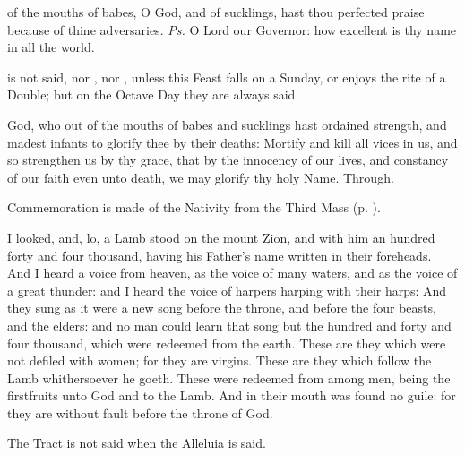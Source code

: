 
\introit
{} of the mouths of babes, O God, and of sucklings, hast thou perfected praise because of thine adversaries. \textit{Ps.} O Lord our Governor: how excellent is thy name in all the world.
\begin{rubric}
     is not said, nor , nor , unless this Feast falls on a Sunday, or enjoys the rite of a  Double; but on the Octave Day they are always said.
\end{rubric}
\collect
{} God, who out of the mouths of babes and sucklings hast ordained strength, and madest infants to glorify thee by their deaths: Mortify and kill all vices in us, and so strengthen us by thy grace, that by the innocency of our lives, and constancy of our faith even unto death, we may glorify thy holy Name. Through.
\begin{rubric}
    Commemoration is made of the Nativity from the Third Mass (p. \pageref{NativityMassIIICollect}).
\end{rubric}
 I looked, and, lo, a Lamb stood on the mount Zion, and with him an hundred forty and four thousand, having his Father's name written in their foreheads. And I heard a voice from heaven, as the voice of many waters, and as the voice of a great thunder: and I heard the voice of harpers harping with their harps: And they sung as it were a new song before the throne, and before the four beasts, and the elders: and no man could learn that song but the hundred and forty and four thousand, which were redeemed from the earth. These are they which were not defiled with women; for they are virgins. These are they which follow the Lamb whithersoever he goeth. These were redeemed from among men, being the firstfruits unto God and to the Lamb. And in their mouth was found no guile: for they are without fault before the throne of God.
\begin{rubric}
     The Tract is not said when the Alleluia is said.
\end{rubric}
